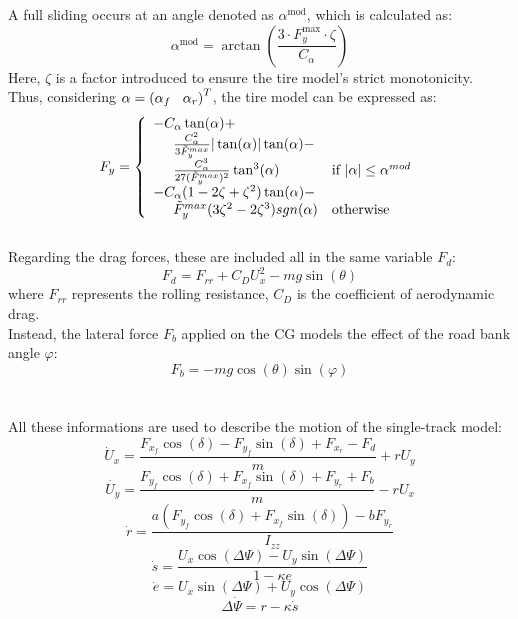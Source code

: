 \documentclass[a4paper, onecolumn, 11pt, twoside]{article}
\newcommand\tab[1][.3cm]{\hspace*{#1}}
\newcommand\tabeq[1][.5cm]{\hspace*{#1}}
\begin{document}
A full sliding occurs at an angle denoted as $\alpha^{\text{mod}}$, which is calculated as:
\begin{equation}
    \alpha^{\text{mod}} = \arctan\left(\frac{3\cdot F_y^{\text{max}}\cdot\zeta}{C_{\alpha}}\right)
\end{equation}
Here, $\zeta$ is a factor introduced to ensure the tire model's strict monotonicity.\\
Thus, considering $\alpha = \left(\alpha_f \tab \alpha_r\right)^T$, the tire model can
be expressed as:
\begin{equation}
    F_y = 
    \left\{
	\begin{array}{ll}
		-C_\alpha \tan(\alpha)+&\\
        \tabeq\frac{C_\alpha^2}{3\tilde{F}_y^{max}}|\tan(\alpha)|\tan(\alpha) - &\\
        \tabeq\frac{C_\alpha^3}{27(\tilde{F}_{y}^{max})^2}\tan^3(\alpha) 
        & \mbox{if } |\alpha| \leq \alpha^{mod} \\
		-C_{\alpha}(1-2\zeta+\zeta^2)\tan(\alpha)-&\\
        \tabeq \tilde{F}_y^{max}(3\zeta^2-2\zeta^3){sgn(\alpha)}
        & \mbox{otherwise }
	\end{array}
    \right.
\end{equation}
\\
Regarding the drag forces, these are included all in the same variable $F_d$:
\begin{equation}
    F_d = F_{rr}+C_DU_x^2-mg\sin(\theta)
\end{equation}
where $F_{rr}$ represents the rolling resistance, $C_D$ is the coefficient of aerodynamic
drag. \\
Instead, the lateral force $F_b$ applied on the CG models the effect of the road bank angle $\varphi$:
\begin{equation}
    F_b = -mg\cos(\theta)\sin(\varphi)
\end{equation}
\\
\\
All these informations are used to describe the motion of the single-track model:
\begin{equation}
    \dot{U}_x = \frac{F_{x_f}\cos(\delta)-F_{y_f}\sin(\delta)+F_{x_r}-F_d}{m}+rU_y
\end{equation}
\begin{equation}
    \dot{U_y} = \frac{F_{y_f}\cos(\delta)+F_{x_f}\sin(\delta)+F_{y_r}+F_b}{m}-rU_x 
\end{equation}
\begin{equation}
    \dot{r} = \frac{a(F_{y_f}\cos(\delta)+F_{x_f}\sin(\delta))-bF_{y_r}}{I_{zz}}
\end{equation}
\begin{equation}
    \dot{s} = \frac{U_x\cos(\Delta \varPsi) -U_y\sin(\Delta \varPsi)}{1-\kappa e}
\end{equation}
\begin{equation}
    \dot{e} = U_x\sin(\Delta \varPsi)+U_y \cos(\Delta \varPsi)
\end{equation}
\begin{equation}
    \Delta \dot{\varPsi} = r-\kappa \dot{s}
\end{equation}
\end{document}
